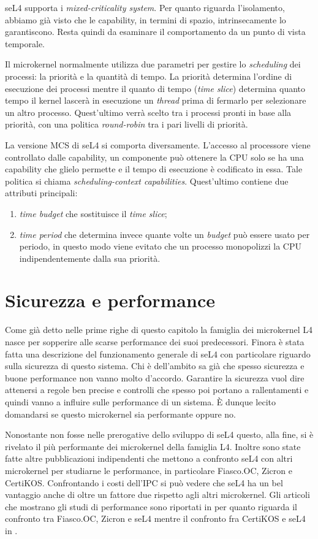 seL4 supporta i \textit{mixed-criticality system}. Per quanto riguarda l'isolamento, abbiamo già visto che le capability, in termini di spazio, intrinsecamente lo garantiscono. Resta quindi da esaminare il comportamento da un punto di vista temporale.

Il microkernel normalmente utilizza due parametri per gestire lo \textit{scheduling} dei processi: la priorità e la quantità di tempo. La priorità determina l'ordine di esecuzione dei processi mentre il quanto di tempo (\textit{time slice}) determina quanto tempo il kernel lascerà in esecuzione un \textit{thread} prima di fermarlo per selezionare un altro processo. Quest'ultimo verrà scelto tra i processi pronti in base alla priorità, con una politica \textit{round-robin} tra i pari livelli di priorità.

La versione MCS di seL4 si comporta diversamente. L'accesso al processore viene controllato dalle capability, un componente può ottenere la CPU solo se ha una capability che glielo permette e il tempo di esecuzione è codificato in essa. Tale politica si chiama \textit{scheduling-context capabilities}. Quest'ultimo contiene due attributi principali: 
\begin{enumerate}
	\item \textit{time budget} che sostituisce il \textit{time slice};
	\item \textit{time period} che determina invece quante volte un \textit{budget} può essere usato per periodo, in questo modo viene evitato che un processo monopolizzi la CPU indipendentemente dalla sua priorità.
\end{enumerate}

\section{Sicurezza e performance}
Come già detto nelle prime righe di questo capitolo la famiglia dei microkernel L4 nasce per sopperire alle scarse performance dei suoi predecessori. Finora è stata fatta una descrizione del funzionamento generale di seL4 con particolare riguardo sulla sicurezza di questo sistema. Chi è dell'ambito sa già che spesso sicurezza e buone performance non vanno molto d'accordo. Garantire la sicurezza vuol dire attenersi a regole ben precise e controlli che spesso poi portano a rallentamenti e quindi vanno a influire sulle performance di un sistema. È dunque lecito domandarsi se questo microkernel sia performante oppure no.

Nonostante non fosse nelle prerogative dello sviluppo di seL4 questo, alla fine, si è rivelato il più performante dei microkernel della famiglia L4. Inoltre sono state fatte altre pubblicazioni indipendenti che mettono a confronto seL4 con altri microkernel per studiarne le performance, in particolare Fiasco.OC, Zicron e CertiKOS. Confrontando i costi dell'IPC si può vedere che seL4 ha un bel vantaggio anche di oltre un fattore due rispetto agli altri microkernel.
Gli articoli che mostrano gli studi di performance sono riportati in \cite{skybridge} per quanto riguarda il confronto tra Fiasco.OC, Zicron e seL4 mentre il confronto fra CertiKOS e seL4 in \cite{CertiKOS}.